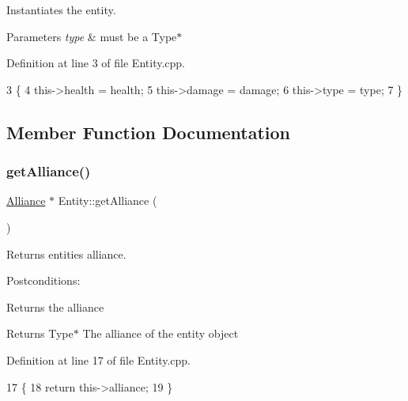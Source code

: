 Instantiates the entity. 


\begin{DoxyParams}{Parameters}
{\em type} & must be a Type$\ast$ \\
\hline
\end{DoxyParams}


Definition at line 3 of file Entity.\+cpp.


\begin{DoxyCode}
3                                                  \{
4     this->health = health;
5     this->damage = damage;
6     this->type = type;
7 \}
\end{DoxyCode}


\subsection{Member Function Documentation}
\mbox{\label{classEntity_aa101047a4bc312b697b65b4c3a39ffc5}} 
\subsubsection{\texorpdfstring{get\+Alliance()}{getAlliance()}}
{\footnotesize\ttfamily \hyperlink{classAlliance}{Alliance} $\ast$ Entity\+::get\+Alliance (\begin{DoxyParamCaption}{ }\end{DoxyParamCaption})}



Returns entities alliance. 

Postconditions\+:
\begin{DoxyItemize}
\item Returns the alliance
\end{DoxyItemize}

\begin{DoxyReturn}{Returns}
Type$\ast$ The alliance of the entity object 
\end{DoxyReturn}


Definition at line 17 of file Entity.\+cpp.


\begin{DoxyCode}
17                               \{
18     \textcolor{keywordflow}{return} this->alliance;
19 \}
\end{DoxyCode}
\mbox{\label{classEntity_ad38d4384aa0adef43443666a33f06508}} 
